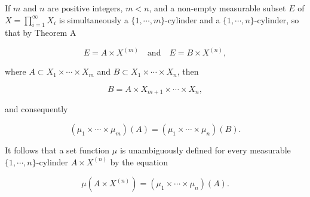If $m$ and $n$ are positive integers, $m < n$, and a non-empty measurable subset $E$ of $X = \prod_{i=1}^{\infty} X_i$ is simultaneously a $\{1, \cdots, m\}$-cylinder and a $\{1, \cdots, n\}$-cylinder, so that by Theorem A

$$E = A \times X^{(m)} \quad \text{and} \quad E = B \times X^{(n)},$$

where $A \subset X_1 \times \cdots \times X_m$ and $B \subset X_1 \times \cdots \times X_n$, then

$$B = A \times X_{m+1} \times \cdots \times X_n,$$

and consequently

$$(\mu_1 \times \cdots \times \mu_m)(A) = (\mu_1 \times \cdots \times \mu_n)(B).$$

It follows that a set function $\mu$ is unambiguously defined for every measurable $\{1, \cdots, n\}$-cylinder $A \times X^{(n)}$ by the equation

$$\mu(A \times X^{(n)}) = (\mu_1 \times \cdots \times \mu_n)(A).$$
